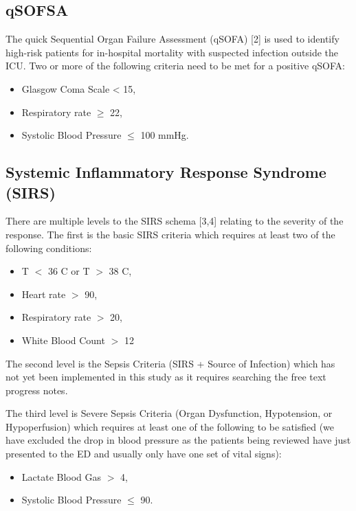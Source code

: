 \documentclass[
  a4paper,
  ,captions=tableheading
]{scrartcl}
\providecommand{\tightlist}{%
  \setlength{\itemsep}{0pt}\setlength{\parskip}{0pt}}
\begin{document}
\subsection{qSOFSA}\label{qsofsa}

The quick Sequential Organ Failure Assessment (qSOFA) {[}2{]} is used to
identify high-risk patients for in-hospital mortality with suspected
infection outside the ICU. Two or more of the following criteria need to
be met for a positive qSOFA:

\begin{itemize}
\tightlist
\item
  Glasgow Coma Scale \textless{} 15,
\item
  Respiratory rate \(\ge\) 22,
\item
  Systolic Blood Pressure \(\le\) 100 mmHg.
\end{itemize}

\subsection{Systemic Inflammatory Response Syndrome
(SIRS)}\label{systemic-inflammatory-response-syndrome-sirs}

There are multiple levels to the SIRS schema {[}3,4{]} relating to the
severity of the response. The first is the basic SIRS criteria which
requires at least two of the following conditions:

\begin{itemize}
\tightlist
\item
  T \(<\) 36 \textdegree C or T \(>\) 38 \textdegree C,
\item
  Heart rate \(>\) 90,
\item
  Respiratory rate \(>\) 20,
\item
  White Blood Count \(>\) 12
\end{itemize}

The second level is the Sepsis Criteria (SIRS + Source of Infection)
which has not yet been implemented in this study as it requires
searching the free text progress notes.

The third level is Severe Sepsis Criteria (Organ Dysfunction,
Hypotension, or Hypoperfusion) which requires at least one of the
following to be satisfied (we have excluded the drop in blood pressure
as the patients being reviewed have just presented to the ED and usually
only have one set of vital signs):

\begin{itemize}
\tightlist
\item
  Lactate Blood Gas \(>\) 4,
\item
  Systolic Blood Pressure \(\le\) 90.
\end{itemize}
\end{document}

